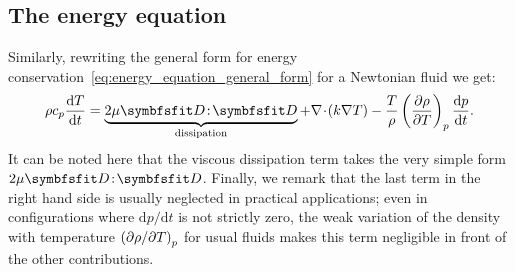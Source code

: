 \subsection{The energy equation}
Similarly, rewriting the general form for energy conservation~\eqref{eq:energy_equation_general_form} for a Newtonian fluid we get:
\begin{equation}
\rho c_p \dd{T}{t} = \underbrace{2\mu\symbfsfit D \!:\! \symbfsfit D}_\text{dissipation} + \nabla\!\cdot\!\lp k\nabla T\rp - \frac{T}{\rho} \lp \pd{\rho}{T}\rp_p \dd{p}{t}.
\label{eq:energy_equation}
\end{equation}
It can be noted here that the viscous dissipation term takes the very simple form $2\mu\symbfsfit D \!:\! \symbfsfit D$. Finally, we remark that the last term in the right hand side is usually neglected in practical applications; even in configurations where $\mathrm dp/\mathrm dt$ is not strictly zero, the weak variation of the density with temperature $\left(\partial\rho / \partial T\right)_p$ for usual fluids makes this term negligible in front of the other contributions.
